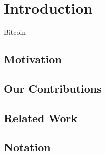 \chapter{Introduction}\label{chapter:introduction}

Bitcoin \cite{bitcoin}

\section{Motivation}
\section{Our Contributions}
\section{Related Work}
\section{Notation}
